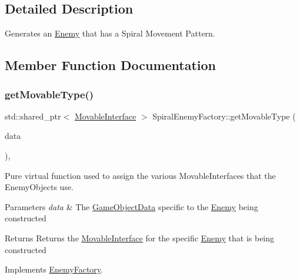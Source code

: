 \subsection{Detailed Description}
Generates an \hyperlink{class_enemy}{Enemy} that has a Spiral Movement Pattern. 

\subsection{Member Function Documentation}
\mbox{\label{class_spiral_enemy_factory_aa05ff998b19ec4ef7ddd86ff24f70cba}} 
\subsubsection{\texorpdfstring{get\+Movable\+Type()}{getMovableType()}}
{\footnotesize\ttfamily std\+::shared\+\_\+ptr$<$ \hyperlink{class_movable_interface}{Movable\+Interface} $>$ Spiral\+Enemy\+Factory\+::get\+Movable\+Type (\begin{DoxyParamCaption}\item[{const \hyperlink{struct_game_object_data}{Game\+Object\+Data} \&}]{data }\end{DoxyParamCaption})\hspace{0.3cm}{\ttfamily [override]}, {\ttfamily [virtual]}}



Pure virtual function used to assign the various Movable\+Interfaces that the Enemy\+Objects use. 


\begin{DoxyParams}{Parameters}
{\em data} & The \hyperlink{struct_game_object_data}{Game\+Object\+Data} specific to the \hyperlink{class_enemy}{Enemy} being constructed \\
\hline
\end{DoxyParams}
\begin{DoxyReturn}{Returns}
Returns the \hyperlink{class_movable_interface}{Movable\+Interface} for the specific \hyperlink{class_enemy}{Enemy} that is being constructed 
\end{DoxyReturn}


Implements \hyperlink{class_enemy_factory_ae064082d650e676960cb84ebb60ba216}{Enemy\+Factory}.

\mbox{\label{class_spiral_enemy_factory_a230709a0781c4364aa062b0bd441ec4d}} 
